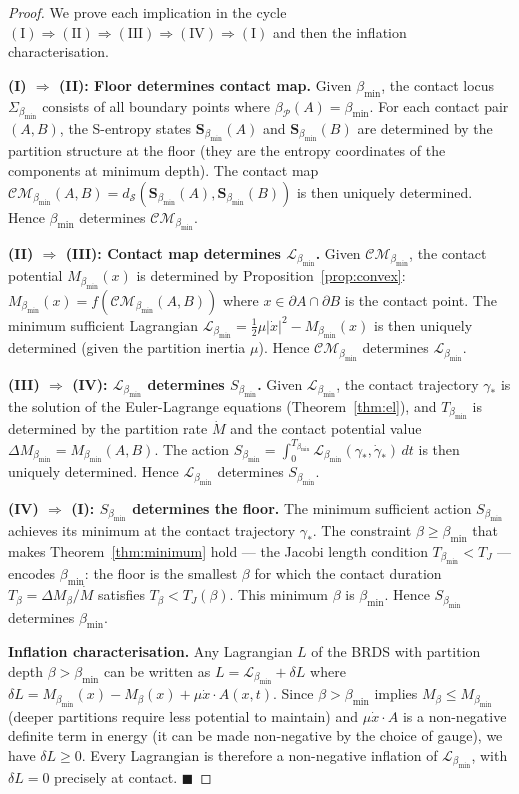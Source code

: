 \documentclass[11pt,twocolumn,a4paper]{article}
\theoremstyle{plain}
\theoremstyle{definition}
\theoremstyle{remark}
\newcommand{\bmin}{\beta_{\min}}
\newcommand{\Lmin}{\mathcal{L}_{\bmin}}
\newcommand{\Smin}{S_{\bmin}}
\newcommand{\CM}{\mathcal{CM}}
\newcommand{\dS}{d_{\mathcal{S}}}
\newcommand{\Pcal}{\mathcal{P}}
\newcommand{\half}{\tfrac{1}{2}}
\renewcommand{\qed}{\hfill$\blacksquare$}
\begin{document}
\begin{proof}
We prove each implication in the cycle $(\mathrm{I}) \Rightarrow (\mathrm{II})
\Rightarrow (\mathrm{III}) \Rightarrow (\mathrm{IV}) \Rightarrow (\mathrm{I})$
and then the inflation characterisation.

\medskip
\textbf{(I) $\Rightarrow$ (II): Floor determines contact map.}
Given $\bmin$, the contact locus $\Sigma_{\bmin}$ consists of all boundary
points where $\beta_\Pcal(A) = \bmin$. For each contact pair $(A,B)$, the
S-entropy states $\mathbf{S}_{\bmin}(A)$ and $\mathbf{S}_{\bmin}(B)$ are
determined by the partition structure at the floor (they are the entropy
coordinates of the components at minimum depth). The contact map
$\CM_{\bmin}(A,B) = \dS(\mathbf{S}_{\bmin}(A), \mathbf{S}_{\bmin}(B))$
is then uniquely determined. Hence $\bmin$ determines $\CM_{\bmin}$.

\medskip
\textbf{(II) $\Rightarrow$ (III): Contact map determines $\Lmin$.}
Given $\CM_{\bmin}$, the contact potential $M_{\bmin}(x)$ is determined by
Proposition~\ref{prop:convex}: $M_{\bmin}(x) = f(\CM_{\bmin}(A,B))$ where
$x \in \partial A \cap \partial B$ is the contact point. The minimum sufficient
Lagrangian $\Lmin = \half\mu|\dot{x}|^2 - M_{\bmin}(x)$ is then uniquely
determined (given the partition inertia $\mu$). Hence $\CM_{\bmin}$ determines
$\Lmin$.

\medskip
\textbf{(III) $\Rightarrow$ (IV): $\Lmin$ determines $\Smin$.}
Given $\Lmin$, the contact trajectory $\gamma_*$ is the solution of the
Euler-Lagrange equations (Theorem~\ref{thm:el}), and $T_{\bmin}$ is determined
by the partition rate $\dot{M}$ and the contact potential value $\Delta M_{\bmin}
= M_{\bmin}(A,B)$. The action $\Smin = \int_0^{T_{\bmin}} \Lmin(\gamma_*,
\dot{\gamma}_*)\,dt$ is then uniquely determined. Hence $\Lmin$ determines $\Smin$.

\medskip
\textbf{(IV) $\Rightarrow$ (I): $\Smin$ determines the floor.}
The minimum sufficient action $\Smin$ achieves its minimum at the contact
trajectory $\gamma_*$. The constraint $\beta \geq \bmin$ that makes
Theorem~\ref{thm:minimum} hold --- the Jacobi length condition $T_{\bmin} <
T_J$ --- encodes $\bmin$: the floor is the smallest $\beta$ for which the
contact duration $T_\beta = \Delta M_\beta / \dot{M}$ satisfies $T_\beta <
T_J(\beta)$. This minimum $\beta$ is $\bmin$. Hence $\Smin$ determines $\bmin$.

\medskip
\textbf{Inflation characterisation.}
Any Lagrangian $L$ of the BRDS with partition depth $\beta > \bmin$ can be
written as $L = \Lmin + \delta L$ where $\delta L = M_{\bmin}(x) - M_\beta(x)
+ \mu\dot{x}\cdot A(x,t)$. Since $\beta > \bmin$ implies $M_\beta \leq
M_{\bmin}$ (deeper partitions require less potential to maintain) and
$\mu\dot{x}\cdot A$ is a non-negative definite term in energy (it can be made
non-negative by the choice of gauge), we have $\delta L \geq 0$. Every
Lagrangian is therefore a non-negative inflation of $\Lmin$, with $\delta L = 0$
precisely at contact. \qed
\end{proof}
\end{document}
